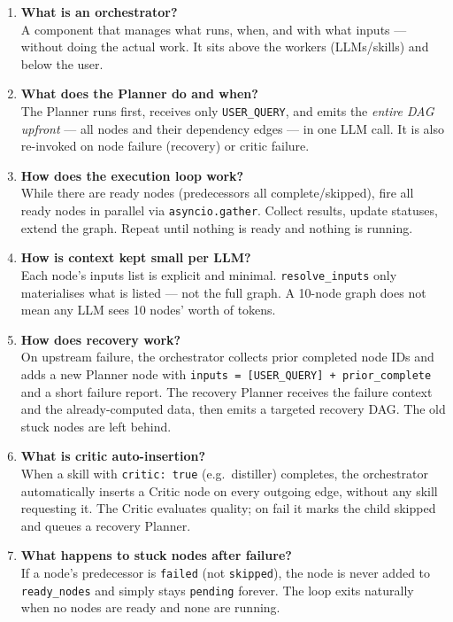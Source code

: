 \documentclass[12pt,a4paper]{article}
\begin{document}
\begin{enumerate}
  \item \textbf{What is an orchestrator?} \\
    A component that manages what runs, when, and with what inputs — without
    doing the actual work. It sits above the workers (LLMs/skills) and below
    the user.

  \item \textbf{What does the Planner do and when?} \\
    The Planner runs first, receives only \texttt{USER\_QUERY}, and emits the
    \emph{entire DAG upfront} — all nodes and their dependency edges — in one
    LLM call. It is also re-invoked on node failure (recovery) or critic failure.

  \item \textbf{How does the execution loop work?} \\
    While there are ready nodes (predecessors all complete/skipped), fire all
    ready nodes in parallel via \texttt{asyncio.gather}. Collect results, update
    statuses, extend the graph. Repeat until nothing is ready and nothing is
    running.

  \item \textbf{How is context kept small per LLM?} \\
    Each node's inputs list is explicit and minimal. \texttt{resolve\_inputs}
    only materialises what is listed — not the full graph. A 10-node graph does
    not mean any LLM sees 10 nodes' worth of tokens.

  \item \textbf{How does recovery work?} \\
    On upstream failure, the orchestrator collects prior completed node IDs and
    adds a new Planner node with \texttt{inputs = [USER\_QUERY] + prior\_complete}
    and a short failure report. The recovery Planner receives the failure context
    and the already-computed data, then emits a targeted recovery DAG. The old
    stuck nodes are left behind.

  \item \textbf{What is critic auto-insertion?} \\
    When a skill with \texttt{critic: true} (e.g.\ distiller) completes, the
    orchestrator automatically inserts a Critic node on every outgoing edge,
    without any skill requesting it. The Critic evaluates quality; on fail it
    marks the child skipped and queues a recovery Planner.

  \item \textbf{What happens to stuck nodes after failure?} \\
    If a node's predecessor is \texttt{failed} (not \texttt{skipped}), the node
    is never added to \mbox{\texttt{ready\_nodes}} and simply stays \texttt{pending}
    forever. The loop exits naturally when no nodes are ready and none are
    running.
\end{enumerate}
\end{document}
